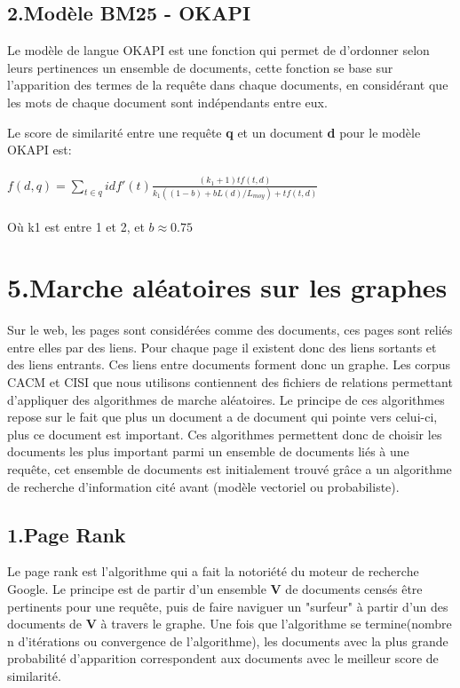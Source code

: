 \documentclass[a4paper,11pt]{report}
\begin{document}
\subsection*{2.Modèle BM25 - OKAPI}

Le modèle de langue OKAPI est une fonction qui permet de d'ordonner selon leurs pertinences un ensemble de documents, cette fonction se base sur l'apparition des termes de la requête dans chaque documents, en considérant que les mots de chaque document sont indépendants entre eux.

Le score de similarité entre une requête \textbf{q} et un document \textbf{d} pour le modèle OKAPI est:\\\\
$f(d,q)=\sum_{t\in q}idf'(t)\frac{(k_1+1)tf(t,d)}{k_1((1-b)+bL(d)/L_{moy})+tf(t,d)}$\\\\
Où k1 est entre 1 et 2, et $b\approx0.75$



\section*{5.Marche aléatoires sur les graphes}
Sur le web, les pages sont considérées comme des documents, ces pages sont reliés entre elles par des liens. Pour chaque page il existent donc des liens sortants et des liens entrants. Ces liens entre documents forment donc un graphe. Les corpus CACM et CISI que nous utilisons contiennent des fichiers de relations permettant d'appliquer des algorithmes de marche aléatoires. Le principe de ces algorithmes repose sur le fait que plus un document a de document qui pointe vers celui-ci, plus ce document est important. Ces algorithmes permettent donc de choisir les documents les plus important parmi un ensemble de documents liés à une requête, cet ensemble de documents est initialement trouvé grâce a un algorithme de recherche d'information cité avant (modèle vectoriel ou probabiliste).

\subsection*{1.Page Rank}
Le page rank est l'algorithme qui a fait la notoriété du moteur de recherche Google. Le principe est de partir d'un ensemble \textbf{V} de documents censés être pertinents pour une requête, puis de faire naviguer un "surfeur" à partir d'un des documents de \textbf{V} à travers le graphe. Une fois que l'algorithme se termine(nombre n d'itérations ou convergence de l'algorithme), les documents avec la plus grande probabilité d'apparition correspondent aux documents avec le meilleur score de similarité.
\end{document}
